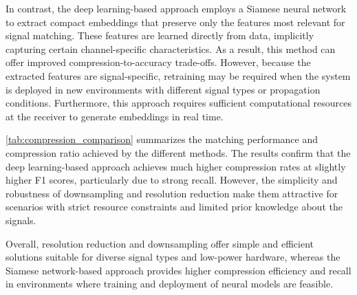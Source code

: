 \documentclass[sigconf, 10pt, nonacm, anonymous]{acmart}  %
\newcommand{\dieter}[1]{{\color{blue}[Dieter: #1]}}
\newcommand{\matthias}[1]{{\color{purple}[Matthias: #1]}}
\begin{document}
In contrast, the deep learning-based approach employs a Siamese neural network to extract compact embeddings that preserve only the features most relevant for signal matching. These features are learned directly from data, implicitly capturing certain channel-specific characteristics. As a result, this method can offer improved compression-to-accuracy trade-offs. However, because the extracted features are signal-specific, retraining may be required when the system is deployed in new environments with different signal types or propagation conditions. Furthermore, this approach requires sufficient computational resources at the receiver to generate embeddings in real time.

\autoref{tab:compression_comparison} summarizes the matching performance and compression ratio achieved by the different methods. The results confirm that the deep learning-based approach achieves much higher compression rates at slightly higher  F1 scores, particularly due to strong recall. However, the simplicity and robustness of downsampling and resolution reduction make them attractive for scenarios with strict resource constraints and limited prior knowledge about the signals.

Overall, resolution reduction and downsampling offer simple and efficient solutions suitable for diverse signal types and low-power hardware, whereas the Siamese network-based approach provides higher compression efficiency and recall in environments where training and deployment of neural models are feasible.








\end{document}
